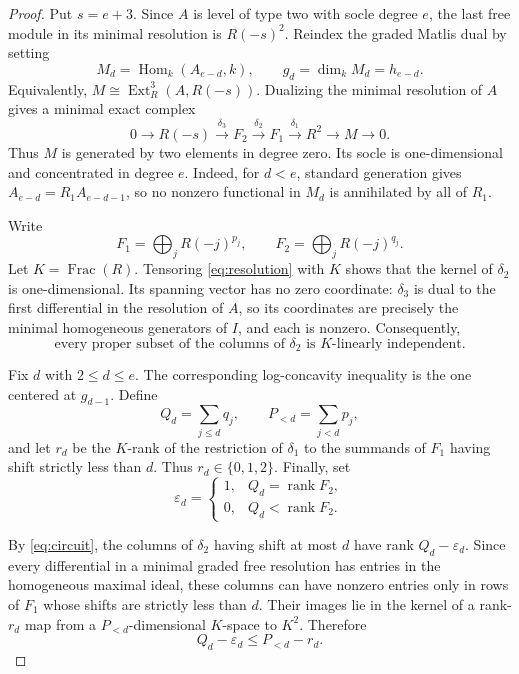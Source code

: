 \documentclass[11pt]{article}
\newcommand{\rank}{\operatorname{rank}}
\begin{document}
\begin{proof}
Put $s=e+3$.  Since $A$ is level of type two with socle degree $e$,
the last free module in its minimal resolution is $R(-s)^2$.
Reindex the graded Matlis dual by setting
\[
  M_d=\operatorname{Hom}_k(A_{e-d},k),
  \qquad
  g_d=\dim_k M_d=h_{e-d}.
\]
Equivalently, $M\cong\operatorname{Ext}^3_R(A,R(-s))$.  Dualizing the
minimal resolution of $A$ gives a minimal exact complex
\begin{equation}
\label{eq:resolution}
  0\longrightarrow R(-s)
  \xrightarrow{\delta_3}F_2
  \xrightarrow{\delta_2}F_1
  \xrightarrow{\delta_1}R^2
  \longrightarrow M\longrightarrow0.
\end{equation}
Thus $M$ is generated by two elements in degree zero.  Its socle is
one-dimensional and concentrated in degree $e$.  Indeed, for $d<e$,
standard generation gives $A_{e-d}=R_1A_{e-d-1}$, so no nonzero
functional in $M_d$ is annihilated by all of $R_1$.

Write
\[
  F_1=\bigoplus_j R(-j)^{p_j},
  \qquad
  F_2=\bigoplus_j R(-j)^{q_j}.
\]
Let $K=\operatorname{Frac}(R)$.  Tensoring
\eqref{eq:resolution} with $K$ shows that the kernel of $\delta_2$ is
one-dimensional.  Its spanning vector has no zero coordinate:
$\delta_3$ is dual to the first differential in the resolution of
$A$, so its coordinates are precisely the minimal homogeneous
generators of $I$, and each is nonzero.
Consequently,
\begin{equation}
\label{eq:circuit}
  \text{every proper subset of the columns of $\delta_2$ is
  $K$-linearly independent.}
\end{equation}

Fix $d$ with $2\leq d\leq e$.  The corresponding log-concavity
inequality is the one centered at $g_{d-1}$.  Define
\[
  Q_d=\sum_{j\leq d}q_j,
  \qquad
  P_{<d}=\sum_{j<d}p_j,
\]
and let $r_d$ be the $K$-rank of the restriction of $\delta_1$ to the
summands of $F_1$ having shift strictly less than $d$.  Thus
$r_d\in\{0,1,2\}$.  Finally, set
\[
  \varepsilon_d=
  \begin{cases}
  1,&Q_d=\rank F_2,\\
  0,&Q_d<\rank F_2.
  \end{cases}
\]

By \eqref{eq:circuit}, the columns of $\delta_2$ having shift at most
$d$ have rank $Q_d-\varepsilon_d$.  Since every differential in a
minimal graded free resolution has entries in the homogeneous maximal
ideal, these columns can have nonzero entries only in rows of $F_1$
whose shifts are strictly less than $d$.  Their images lie in the
kernel of a rank-$r_d$ map from a $P_{<d}$-dimensional $K$-space to
$K^2$.  Therefore
\begin{equation}
\label{eq:rankbound}
  Q_d-\varepsilon_d\leq P_{<d}-r_d.
\end{equation}


\end{proof}
\end{document}
